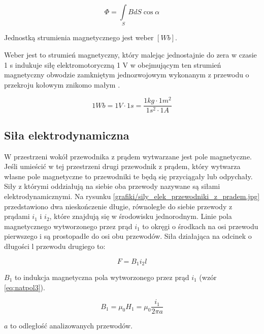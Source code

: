 \begin{equation} \label{eq:strindmag3}
	\Phi = \int\limits_S B dS \cos{\alpha}
\end{equation}
	   
Jednostką strumienia magnetycznego jest weber $ [Wb] $.

\begin{defn}
	Weber jest to strumień magnetyczny, który malejąc jednostajnie do zera w czasie 1 s indukuje siłę elektromotoryczną 1 V w obejmującym ten strumień magnetyczny obwodzie zamkniętym jednozwojowym wykonanym z przewodu o przekroju kołowym znikomo małym \cite{kaluszko}.
\end{defn}   

\begin{equation} \label{eq:strindmag4}
	1 Wb = 1 V \cdot 1 s = \frac{1 kg \cdot 1 m^2}{1 s^2 \cdot 1 A}
\end{equation}

\subsection{Siła elektrodynamiczna}

W przestrzeni wokół przewodnika z prądem wytwarzane jest pole magnetyczne. Jeśli umieścić w tej przestrzeni drugi przewodnik z prądem, który wytwarza własne pole magnetyczne to przewodniki te będą się przyciągały lub odpychały. Siły z którymi oddziałują na siebie oba przewody nazywane są siłami elektrodynamicznymi. Na rysunku \ref{grafiki/sily_elek_przewodniki_z_pradem.jpg} przedstawiono dwa nieskończenie długie, równoległe do siebie przewody z prądami $ i_1 $ i $ i_2 $, które znajdują się w środowisku jednorodnym. Linie pola magnetycznego wytworzonego przez prąd $ i_1 $ to okręgi o środkach na osi przewodu pierwszego i są prostopadłe do osi obu przewodów. Siła działająca na odcinek o długości l przewodu drugiego to:

\begin{equation} \label{eq:silapola1}
	F = B_1 i_2 l
\end{equation}

$ B_1 $ to indukcja magnetyczna pola wytworzonego przez prąd $ i_1 $ (wzór \ref{eq:natpol3}).

\begin{equation} \label{eq:silapola2}
	B_1 = \mu_0 H_1 = \mu_0 \frac{i_1}{2 \pi a}
\end{equation} 

$ a $ to odległość analizowanych przewodów. 

